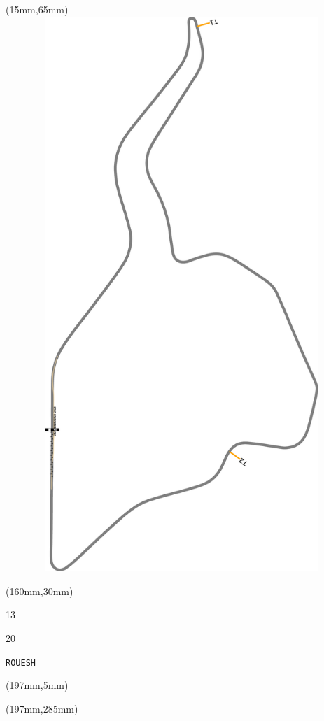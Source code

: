 \begin{textblock*}{185mm}(15mm,65mm)%
\centering
\mbox{\includegraphics[width=185mm,height=210mm,keepaspectratio]{PT/ROUESH.pdf}}
\end{textblock*}
\begin{textblock*}{40mm}(160mm,30mm)%
\Large
\par{} 
\par13 
\par20 
\par\hfill\tiny\tt ROUESH\\
\end{textblock*}
\begin{textblock*}{20mm}(197mm,5mm)%
\fbox{\thepage}
\label{ROUESH}
\end{textblock*}
\begin{textblock*}{20mm}(197mm,285mm)%
\fbox{\thepage}
\end{textblock*}

